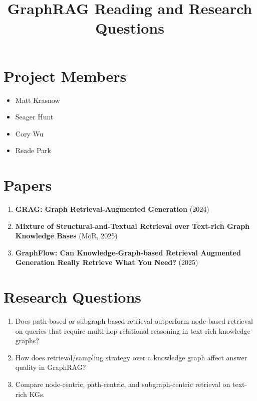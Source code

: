 \documentclass[11pt]{article}
\title{GraphRAG Reading and Research Questions}
\author{}
\date{}
\begin{document}
\maketitle

\section*{Project Members}
\begin{itemize}
    \item Matt Krasnow
    \item Seager Hunt
    \item Cory Wu
    \item Reade Park
\end{itemize}

\section*{Papers}
\begin{enumerate}
    \item \textbf{GRAG: Graph Retrieval-Augmented Generation} (2024)
    \item \textbf{Mixture of Structural-and-Textual Retrieval over Text-rich Graph Knowledge Bases} (MoR, 2025)
    \item \textbf{GraphFlow: Can Knowledge-Graph-based Retrieval Augmented Generation Really Retrieve What You Need?} (2025)
\end{enumerate}

\section*{Research Questions}
\begin{enumerate}
    \item Does path-based or subgraph-based retrieval outperform node-based retrieval on queries that require multi-hop relational reasoning in text-rich knowledge graphs?
    \item How does retrieval/sampling strategy over a knowledge graph affect answer quality in GraphRAG?
    \item Compare node-centric, path-centric, and subgraph-centric retrieval on text-rich KGs.
\end{enumerate}
\end{document}
